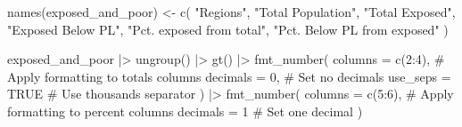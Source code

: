 \documentclass[
  letterpaper,
  DIV=11,
  numbers=noendperiod]{scrartcl}
\newenvironment{Shaded}{}{}
\newcommand{\AttributeTok}[1]{\textcolor[rgb]{0.84,0.23,0.29}{#1}}
\newcommand{\CommentTok}[1]{\textcolor[rgb]{0.42,0.45,0.49}{#1}}
\newcommand{\ConstantTok}[1]{\textcolor[rgb]{0.00,0.36,0.77}{#1}}
\newcommand{\DecValTok}[1]{\textcolor[rgb]{0.00,0.36,0.77}{#1}}
\newcommand{\FunctionTok}[1]{\textcolor[rgb]{0.44,0.26,0.76}{#1}}
\newcommand{\NormalTok}[1]{\textcolor[rgb]{0.14,0.16,0.18}{#1}}
\newcommand{\OtherTok}[1]{\textcolor[rgb]{0.44,0.26,0.76}{#1}}
\newcommand{\SpecialCharTok}[1]{\textcolor[rgb]{0.00,0.36,0.77}{#1}}
\newcommand{\StringTok}[1]{\textcolor[rgb]{0.01,0.18,0.38}{#1}}
\begin{document}
\begin{Shaded}
\begin{Highlighting}[]
\FunctionTok{names}\NormalTok{(exposed\_and\_poor) }\OtherTok{\textless{}{-}} \FunctionTok{c}\NormalTok{(}
  \StringTok{"Regions"}\NormalTok{,}
  \StringTok{"Total Population"}\NormalTok{,}
  \StringTok{"Total Exposed"}\NormalTok{,}
  \StringTok{"Exposed Below PL"}\NormalTok{,}
  \StringTok{"Pct. exposed from total"}\NormalTok{,}
  \StringTok{"Pct. Below PL from exposed"}
\NormalTok{)}

\NormalTok{exposed\_and\_poor }\SpecialCharTok{|\textgreater{}} 
  \FunctionTok{ungroup}\NormalTok{() }\SpecialCharTok{|\textgreater{}} 
  \FunctionTok{gt}\NormalTok{() }\SpecialCharTok{|\textgreater{}} 
  \FunctionTok{fmt\_number}\NormalTok{(}
    \AttributeTok{columns =} \FunctionTok{c}\NormalTok{(}\DecValTok{2}\SpecialCharTok{:}\DecValTok{4}\NormalTok{),   }\CommentTok{\# Apply formatting to totals columns}
    \AttributeTok{decimals =} \DecValTok{0}\NormalTok{,                 }\CommentTok{\# Set no decimals}
    \AttributeTok{use\_seps =} \ConstantTok{TRUE}               \CommentTok{\# Use thousands separator}
\NormalTok{  ) }\SpecialCharTok{|\textgreater{}} 
  \FunctionTok{fmt\_number}\NormalTok{(}
    \AttributeTok{columns =} \FunctionTok{c}\NormalTok{(}\DecValTok{5}\SpecialCharTok{:}\DecValTok{6}\NormalTok{),   }\CommentTok{\# Apply formatting to percent columns}
    \AttributeTok{decimals =} \DecValTok{1}                 \CommentTok{\# Set one decimal}
\NormalTok{  )}
\end{Highlighting}
\end{Shaded}
\end{document}
